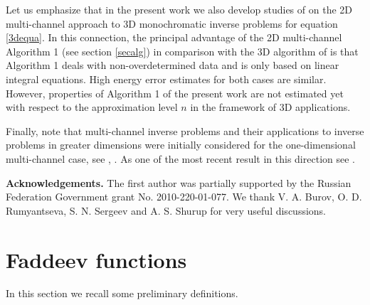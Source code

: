 \documentclass[11pt,a4paper,english,subeqn]{amsart}
\theoremstyle{plain}
\theoremstyle{definition}
\numberwithin{equation}{section}
\begin{document}
Let us emphasize that in the present work we also develop studies of \cite{NS2} on the 2D multi-channel approach to 3D monochromatic inverse problems for equation \eqref{3dequa}. In this connection, the principal advantage of the 2D multi-channel Algorithm 1 (see section \ref{secalg})  in comparison with the 3D algorithm of \cite{N6} is that Algorithm 1 deals with non-overdetermined data and is only based on linear integral equations. High energy error estimates for both cases are similar. However, properties of Algorithm 1 of the present work are not estimated yet with respect to the approximation level $n$ in the framework of 3D applications.

Finally, note that multi-channel inverse problems and their applications to inverse problems in greater dimensions were initially considered for the one-dimensional multi-channel case, see \cite{AM}, \cite{ZS}. As one of the most recent result in this direction see \cite{K}.\smallskip

{\bf Acknowledgements.} The first author was partially supported by  the Russian Federation Government
grant No. 2010-220-01-077. We thank V. A. Burov, O. D. Rumyantseva, S. N. Sergeev and A. S. Shurup for very useful discussions.

\section{Faddeev functions}

In this section we recall some preliminary definitions.
\end{document}
